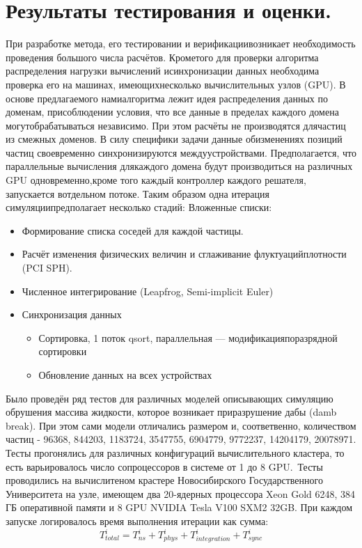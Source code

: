 \section{Результаты тестирования и оценки.}\label{sec:ch3/sect4}
При   разработке   метода,   его   тестировании   и   верификациивозникает необходимость проведения большого числа расчётов. Крометого для проверки алгоритма распределения нагрузки вычислений исинхронизации данных необходима проверка его на машинах, имеющихнесколько вычислительных узлов (GPU). В основе предлагаемого намиалгоритма   лежит   идея   распределения   данных   по   доменам,   присоблюдении условия, что все данные в пределах каждого домена могутобрабатываться независимо. При этом расчёты не производятся длячастиц из смежных доменов. В силу специфики задачи данные обизменениях   позиций   частиц   своевременно   синхронизируются   междуустройствами.   Предполагается,   что   параллельные   вычисления   длякаждого домена будут производиться на различных GPU одновременно,кроме   того   каждый   контроллер   каждого   решателя,   запускается   вотдельном   потоке.   Таким   образом   одна   итерация   симуляциипредполагает несколько стадий:
\noindent Вложенные списки:
\begin{itemize}
  \item Формирование списка соседей для каждой частицы.
  \item Расчёт изменения физических величин и сглаживание флуктуацийплотности (PCI SPH).
  \item Численное интегрирование (Leapfrog, Semi-implicit Euler)
  \item Синхронизация данных
        \begin{itemize}
          \item Сортировка, 1 поток qsort, параллельная — модификацияпоразрядной сортировки
          \item Обновление данных на всех устройствах
        \end{itemize}
\end{itemize}
Было проведён ряд тестов для различных моделей описывающих симуляцию обрушения массива жидкости, которое возникает приразрушение дабы (damb break). При этом сами модели отличались размером и, соответвенно, количеством частиц - 96368, 844203, 1183724, 3547755, 6904779, 9772237, 14204179, 20078971. Тесты прогонялись для различных конфигураций вычислительного кластера, то есть варьировалось число сопроцессоров в системе от 1 до 8 GPU. Тесты проводились на вычислитеном крастере Новосибирского Государственного Университета на узле, имеющем два 20-ядерных процессора Xeon Gold 6248, 384 ГБ оперативной памяти и 8 GPU NVIDIA Tesla V100 SXM2 32GB. При каждом запуске логировалось время выполнения итерации как сумма:
\[
  T_{total}^{i} = T_{ns}^{i} + T_{phys}^{i} + T_{integration}^{i} + T_{sync}^{i}
\]

